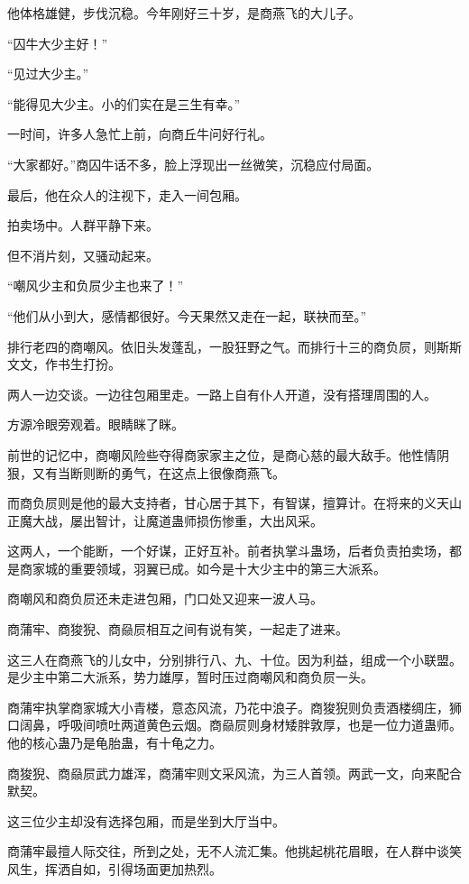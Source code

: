\begin{this_body}
他体格雄健，步伐沉稳。今年刚好三十岁，是商燕飞的大儿子。

“囚牛大少主好！”

“见过大少主。”

“能得见大少主。小的们实在是三生有幸。”

一时间，许多人急忙上前，向商丘牛问好行礼。

“大家都好。”商囚牛话不多，脸上浮现出一丝微笑，沉稳应付局面。

最后，他在众人的注视下，走入一间包厢。

拍卖场中。人群平静下来。

但不消片刻，又骚动起来。

“嘲风少主和负屃少主也来了！”

“他们从小到大，感情都很好。今天果然又走在一起，联袂而至。”

排行老四的商嘲风。依旧头发蓬乱，一股狂野之气。而排行十三的商负屃，则斯斯文文，作书生打扮。

两人一边交谈。一边往包厢里走。一路上自有仆人开道，没有搭理周围的人。

方源冷眼旁观着。眼睛眯了眯。

前世的记忆中，商嘲风险些夺得商家家主之位，是商心慈的最大敌手。他性情阴狠，又有当断则断的勇气，在这点上很像商燕飞。

而商负屃则是他的最大支持者，甘心居于其下，有智谋，擅算计。在将来的义天山正魔大战，屡出智计，让魔道蛊师损伤惨重，大出风采。

这两人，一个能断，一个好谋，正好互补。前者执掌斗蛊场，后者负责拍卖场，都是商家城的重要领域，羽翼已成。如今是十大少主中的第三大派系。

商嘲风和商负屃还未走进包厢，门口处又迎来一波人马。

商蒲牢、商狻猊、商赑屃相互之间有说有笑，一起走了进来。

这三人在商燕飞的儿女中，分别排行八、九、十位。因为利益，组成一个小联盟。是少主中第二大派系，势力雄厚，暂时压过商嘲风和商负屃一头。

商蒲牢执掌商家城大小青楼，意态风流，乃花中浪子。商狻猊则负责酒楼绸庄，狮口阔鼻，呼吸间喷吐两道黄色云烟。商赑屃则身材矮胖敦厚，也是一位力道蛊师。他的核心蛊乃是龟胎蛊，有十龟之力。

商狻猊、商赑屃武力雄浑，商蒲牢则文采风流，为三人首领。两武一文，向来配合默契。

这三位少主却没有选择包厢，而是坐到大厅当中。

商蒲牢最擅人际交往，所到之处，无不人流汇集。他挑起桃花眉眼，在人群中谈笑风生，挥洒自如，引得场面更加热烈。


\end{this_body}
